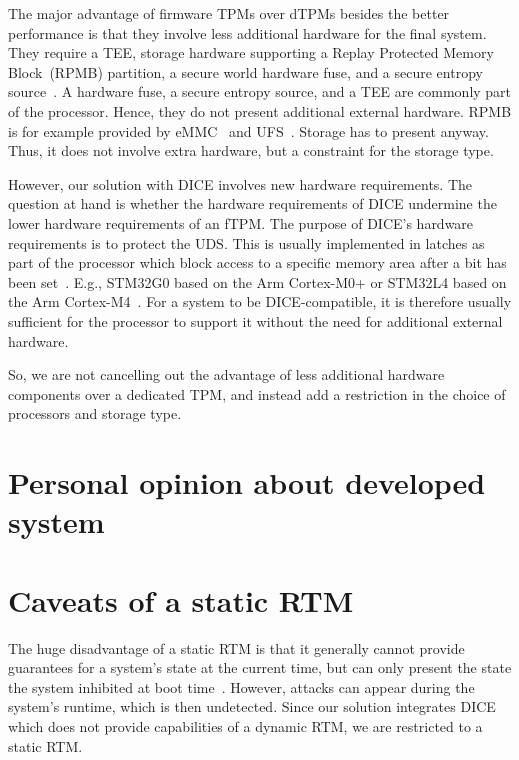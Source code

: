 The major advantage of firmware TPMs over dTPMs besides the better performance is that they involve less additional hardware for the final system.
They require a TEE, storage hardware supporting a Replay Protected Memory Block~(RPMB) partition, a secure world hardware fuse, and a secure entropy source~\cite{Raj2015}.
A hardware fuse, a secure entropy source, and a TEE are commonly part of the processor.
Hence, they do not present additional external hardware.
RPMB is for example provided by eMMC~\cite{eMMC} and UFS~\cite{UFS}.
Storage has to present anyway.
Thus, it does not involve extra hardware, but a constraint for the storage type.

However, our solution with DICE involves new hardware requirements.
The question at hand is whether the hardware requirements of DICE undermine the lower hardware requirements of an fTPM\@.
The purpose of DICE's hardware requirements is to protect the UDS\@.
This is usually implemented in latches as part of the processor which block access to a specific memory area after a bit has been set~\cite{Lorych2022}.
E.g., STM32G0 based on the Arm Cortex-M0+ or STM32L4 based on the Arm Cortex-M4~\cite{Lorych2022}.
For a system to be DICE-compatible, it is therefore usually sufficient for the processor to support it without the need for additional external hardware.

So, we are not cancelling out the advantage of less additional hardware components over a dedicated TPM, and instead add a restriction in the choice of processors and storage type.

\section{Personal opinion about developed system}



\section{Caveats of a static RTM}

The huge disadvantage of a static RTM is that it generally cannot provide guarantees for a system's state at the current time, but can only present the state the system inhibited at boot time~\cite{EURECOM+3536}.
However, attacks can appear during the system's runtime, which is then undetected.
Since our solution integrates DICE which does not provide capabilities of a dynamic RTM, we are restricted to a static RTM\@.
